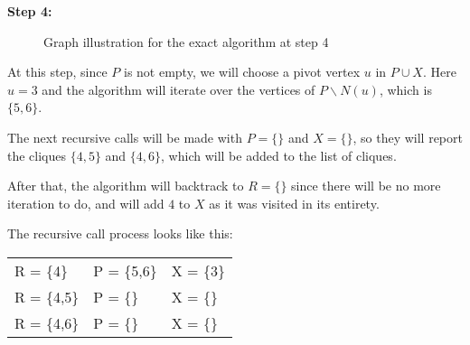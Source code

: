 \begin{minipage}{\linewidth}
    \textbf{Step 4:} \newline
    \begin{minipage}{0.4\textwidth}
        \begin{figure}[H]
            \centering
            \caption{Graph illustration for the exact algorithm at step 4}
            \label{fig:exact-mewc-step4}
        \end{figure}
    \end{minipage}
    \begin{minipage}{0.6\textwidth}
        At this step, since $P$ is not empty, we will choose a pivot vertex $u$
        in $P\cup X$. Here $u = 3$ and the algorithm will iterate over the
        vertices of $P\backslash N(u)$, which is $\{5,6\}$. \newline

        The next recursive calls will be made with $P = \{\}$ and $X = \{\}$, so
        they will report the cliques $\{4,5\}$ and $\{4,6\}$, which will be
        added to the list of cliques. \newline

        After that, the algorithm will backtrack to $R=\{\}$ since there will be
        no more iteration to do, and will add $4$ to $X$ as it was visited in
        its entirety. \newline

        The recursive call process looks like this:
        \begin{center}
            \begin{tabular}{|lll|}
                \hline
                R = \{4\}   & P = \{5,6\} & X = \{3\} \\
                R = \{4,5\} & P = \{\}    & X = \{\}  \\
                R = \{4,6\} & P = \{\}    & X = \{\}  \\
                \hline
            \end{tabular}
        \end{center}
    \end{minipage}
\end{minipage} \newline

